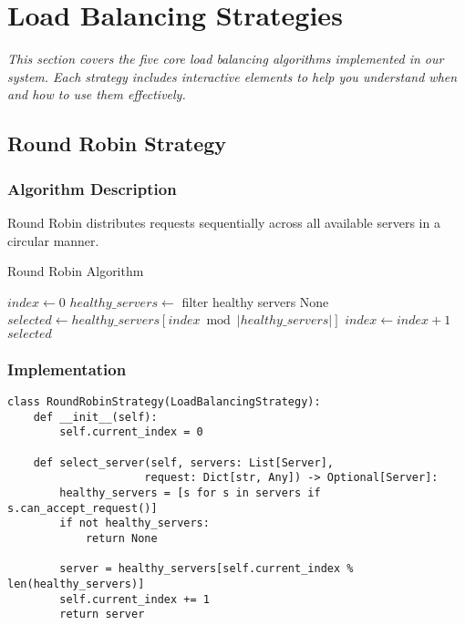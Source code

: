 \documentclass[12pt,a4paper]{article}
\begin{document}
\section{Load Balancing Strategies}
\label{sec:strategies}

\textit{This section covers the five core load balancing algorithms implemented in our system. Each strategy includes interactive elements to help you understand when and how to use them effectively.}

\subsection{Round Robin Strategy}
\label{subsec:roundrobin}

\subsubsection{Algorithm Description}
Round Robin distributes requests sequentially across all available servers in a circular manner.

\begin{algorithm}
\caption{Round Robin Algorithm}
\begin{algorithmic}[1]
\STATE $index \leftarrow 0$
    \STATE $healthy\_servers \leftarrow$ filter healthy servers
        \RETURN None
    \ENDIF
    \STATE $selected \leftarrow healthy\_servers[index \bmod |healthy\_servers|]$
    \STATE $index \leftarrow index + 1$
    \RETURN $selected$
\ENDWHILE
\end{algorithmic}
\end{algorithm}

\subsubsection{Implementation}
\begin{lstlisting}[caption=Round Robin Strategy]
class RoundRobinStrategy(LoadBalancingStrategy):
    def __init__(self):
        self.current_index = 0
    
    def select_server(self, servers: List[Server], 
                     request: Dict[str, Any]) -> Optional[Server]:
        healthy_servers = [s for s in servers if s.can_accept_request()]
        if not healthy_servers:
            return None
        
        server = healthy_servers[self.current_index % len(healthy_servers)]
        self.current_index += 1
        return server
\end{lstlisting}
\end{document}
